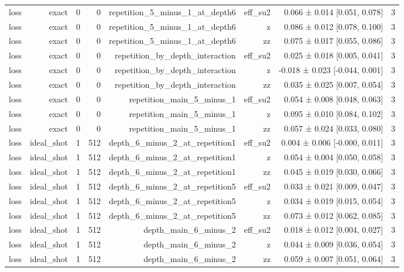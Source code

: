 \begin{table}
\begin{tabular}{lrrrrrrr}
loss & exact & 0 & 0 & repetition\_5\_minus\_1\_at\_depth6 & eff\_su2 & 0.066 ± 0.014 [0.051, 0.078] & 3 \\
loss & exact & 0 & 0 & repetition\_5\_minus\_1\_at\_depth6 & z & 0.086 ± 0.012 [0.078, 0.100] & 3 \\
loss & exact & 0 & 0 & repetition\_5\_minus\_1\_at\_depth6 & zz & 0.075 ± 0.017 [0.055, 0.086] & 3 \\
loss & exact & 0 & 0 & repetition\_by\_depth\_interaction & eff\_su2 & 0.025 ± 0.018 [0.005, 0.041] & 3 \\
loss & exact & 0 & 0 & repetition\_by\_depth\_interaction & z & -0.018 ± 0.023 [-0.044, 0.001] & 3 \\
loss & exact & 0 & 0 & repetition\_by\_depth\_interaction & zz & 0.035 ± 0.025 [0.007, 0.054] & 3 \\
loss & exact & 0 & 0 & repetition\_main\_5\_minus\_1 & eff\_su2 & 0.054 ± 0.008 [0.048, 0.063] & 3 \\
loss & exact & 0 & 0 & repetition\_main\_5\_minus\_1 & z & 0.095 ± 0.010 [0.084, 0.102] & 3 \\
loss & exact & 0 & 0 & repetition\_main\_5\_minus\_1 & zz & 0.057 ± 0.024 [0.033, 0.080] & 3 \\
loss & ideal\_shot & 1 & 512 & depth\_6\_minus\_2\_at\_repetition1 & eff\_su2 & 0.004 ± 0.006 [-0.000, 0.011] & 3 \\
loss & ideal\_shot & 1 & 512 & depth\_6\_minus\_2\_at\_repetition1 & z & 0.054 ± 0.004 [0.050, 0.058] & 3 \\
loss & ideal\_shot & 1 & 512 & depth\_6\_minus\_2\_at\_repetition1 & zz & 0.045 ± 0.019 [0.030, 0.066] & 3 \\
loss & ideal\_shot & 1 & 512 & depth\_6\_minus\_2\_at\_repetition5 & eff\_su2 & 0.033 ± 0.021 [0.009, 0.047] & 3 \\
loss & ideal\_shot & 1 & 512 & depth\_6\_minus\_2\_at\_repetition5 & z & 0.034 ± 0.019 [0.015, 0.054] & 3 \\
loss & ideal\_shot & 1 & 512 & depth\_6\_minus\_2\_at\_repetition5 & zz & 0.073 ± 0.012 [0.062, 0.085] & 3 \\
loss & ideal\_shot & 1 & 512 & depth\_main\_6\_minus\_2 & eff\_su2 & 0.018 ± 0.012 [0.004, 0.027] & 3 \\
loss & ideal\_shot & 1 & 512 & depth\_main\_6\_minus\_2 & z & 0.044 ± 0.009 [0.036, 0.054] & 3 \\
loss & ideal\_shot & 1 & 512 & depth\_main\_6\_minus\_2 & zz & 0.059 ± 0.007 [0.051, 0.064] & 3 \\

\end{tabular}
\end{table}

